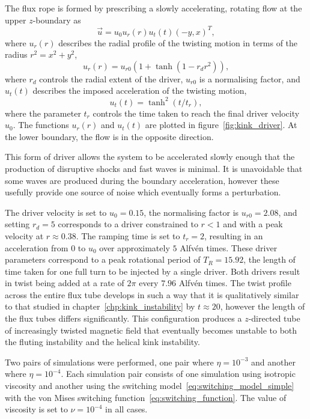 The flux rope is formed by prescribing a slowly accelerating, rotating flow at the upper $z$-boundary as
\begin{equation}
  \label{eq:null_twisting_profile}
  \vec{u} = u_0 u_r(r) u_t(t) (-y, x)^T,
\end{equation}
where $u_r(r)$ describes the radial profile of the twisting motion in terms of the radius $r^2 = x^2 + y^2$,
\begin{equation}
  \label{eq:radial_twisting_function}
  u_r(r) = u_{r0}(1 + \tanh(1 - r_d r^2)),
\end{equation}
where $r_d$ controls the radial extent of the driver, $u_{r0}$ is a normalising factor, and $u_t(t)$ describes the imposed acceleration of the twisting motion,
\begin{equation}
  \label{eq:ramping_up_function}
  u_t(t) = \tanh^2(t/t_r),
\end{equation}
where the parameter $t_r$ controls the time taken to reach the final driver velocity $u_0$. The functions $u_r(r)$ and $u_t(t)$ are plotted in figure~\ref{fig:kink_driver}. At the lower boundary, the flow is in the opposite direction.

This form of driver allows the system to be accelerated slowly enough that the production of disruptive shocks and fast waves is minimal. It is unavoidable that some waves are produced during the boundary acceleration, however these usefully provide one source of noise which eventually forms a perturbation.

The driver velocity is set to $u_0 = 0.15$, the normalising factor is $u_{r0} = 2.08$, and setting $r_d = 5$ corresponds to a driver constrained to $r<1$ and with a peak velocity at $r\approx 0.38$. The ramping time is set to $t_r = 2$, resulting in an acceleration from $0$ to $u_0$ over approximately $5$ Alfv\'en times. These driver parameters correspond to a peak rotational period of $T_R = 15.92$, the length of time taken for one full turn to be injected by a single driver. Both drivers result in twist being added at a rate of $2\pi$ every $7.96$ Alfv\'en times. The twist profile across the entire flux tube develops in such a way that it is qualitatively similar to that studied in chapter~\ref{chp:kink_instability} by $t\approx 20$, however the length of the flux tubes differs significantly. This configuration produces a $z$-directed tube of increasingly twisted magnetic field that eventually becomes unstable to both the fluting instability and the helical kink instability.

Two pairs of simulations were performed, one pair where $\eta=10^{-3}$ and another where $\eta=10^{-4}$. Each simulation pair consists of one simulation using isotropic viscosity and another using the switching model~\eqref{eq:switching_model_simple} with the von Mises switching function~\eqref{eq:switching_function}. The value of viscosity is set to $\nu = 10^{-4}$ in all cases.

